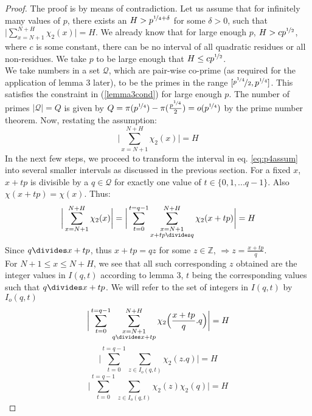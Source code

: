\documentclass{report}
\begin{document}
\begin{proof}
The proof is by means of contradiction. Let us assume that for infinitely many values of $p$, there exists an $H>p^{\nicefrac{1}{4}+\delta}$ for some $\delta>0$, such that $\Big \lvert \sum\limits_{x=N+1}^{N+H}\chi_2(x)\Big \rvert=H$. We already know that for large enough $p$, $H>cp^{\nicefrac{1}{2}}$, where $c$ is some constant, there can be no interval of all quadratic residues or all non-residues. We take $p$ to be large enough that $H\leq cp^{\nicefrac{1}{2}}$.\\
We take numbers in a set $\mathcal{Q}$, which are pair-wise co-prime (as required for the application of lemma 3 later), to be the primes in the range $[\nicefrac{p^{\nicefrac{1}{4}}}{2},p^{\nicefrac{1}{4}}]$.
This satisfies the constraint in (\ref{lemma3cond}) for large enough $p$. The number of primes $\lvert\mathcal{Q}\rvert=Q$ is given by $Q=\pi(p^{\nicefrac{1}{4}})-\pi(\frac{p^{\nicefrac{1}{4}}}{2})=o(p^{\nicefrac{1}{4}})$ by the prime number theorem. Now, restating the assumption:
\begin{equation} \label{eq:p4assum}
\bigg \lvert\sum\limits_{x=N+1}^{N+H}\chi_2(x)\bigg \rvert=H
\end{equation}
In the next few steps, we proceed to transform the interval in eq. \ref{eq:p4assum} into several smaller intervals as discussed in the previous section. For a fixed $x$, $x+tp$ is divisible by a $q\in\mathcal{Q}$ for exactly one value of $t\in\{0,1,...q-1\}$. Also $\chi(x+tp)=\chi(x)$. Thus:
\[
\bigg \lvert\sum\limits_{x=N+1}^{N+H}\chi_2(x)\bigg \rvert=\bigg \lvert\sum\limits_{t=0}^{t=q-1}\sum\limits_{\substack{x=N+1\\x+tp\divides q}}^{N+H}\chi_2(x+tp)\bigg \rvert=H
\]
Since $q\divides x+tp$, thus $x+tp=qz$ for some $z\in\mathbb{Z}$, $\Rightarrow z=\frac{x+tp}{q}$.\\
For $N+1\leq x \leq N+H$, we see that all such corresponding $z$ obtained are the integer values in $I(q,t)$ according to lemma 3, $t$ being the corresponding values such that $q \divides x+tp$. We will refer to the set of integers in $I(q,t)$ by $I_o(q,t)$
$$\bigg \lvert\sum\limits_{t=0}^{t=q-1}\sum\limits_{\substack{x=N+1\\q\divides x+tp}}^{N+H} \chi_2 \Big(\frac{x+tp}{q}.q\Big)\bigg \rvert=H$$
$$\bigg \lvert\sum\limits_{t=0}^{t=q-1}\sum\limits_{z\in I_o(q,t)}\chi_2(z.q)\bigg \rvert=H$$
\begin{equation} \label{chapter3refeq}
\bigg \lvert\sum\limits_{t=0}^{t=q-1}\sum\limits_{z\in I_o(q,t)}\chi_2(z)\chi_2(q)\bigg \rvert=H

\end{equation}
\end{proof}
\end{document}
